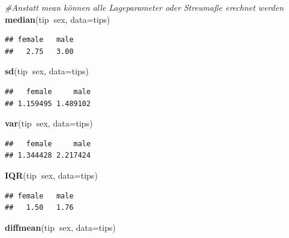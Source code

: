 \documentclass[10pt,ngerman,onside]{article}
\newenvironment{Shaded}{\begin{snugshade}}{\end{snugshade}}
\newcommand{\KeywordTok}[1]{\textcolor[rgb]{0.13,0.29,0.53}{\textbf{#1}}}
\newcommand{\DataTypeTok}[1]{\textcolor[rgb]{0.13,0.29,0.53}{#1}}
\newcommand{\CommentTok}[1]{\textcolor[rgb]{0.56,0.35,0.01}{\textit{#1}}}
\newcommand{\OperatorTok}[1]{\textcolor[rgb]{0.81,0.36,0.00}{\textbf{#1}}}
\newcommand{\NormalTok}[1]{#1}
\begin{document}
\begin{Shaded}
\begin{Highlighting}[]
\CommentTok{#Anstatt mean können alle Lageparameter oder Streumaße erechnet werden }
\KeywordTok{median}\NormalTok{(tip}\OperatorTok{~}\NormalTok{sex, }\DataTypeTok{data=}\NormalTok{tips)}
\end{Highlighting}
\end{Shaded}

\begin{verbatim}
## female   male 
##   2.75   3.00
\end{verbatim}

\begin{Shaded}
\begin{Highlighting}[]
\KeywordTok{sd}\NormalTok{(tip}\OperatorTok{~}\NormalTok{sex, }\DataTypeTok{data=}\NormalTok{tips)}
\end{Highlighting}
\end{Shaded}

\begin{verbatim}
##   female     male 
## 1.159495 1.489102
\end{verbatim}

\begin{Shaded}
\begin{Highlighting}[]
\KeywordTok{var}\NormalTok{(tip}\OperatorTok{~}\NormalTok{sex, }\DataTypeTok{data=}\NormalTok{tips)}
\end{Highlighting}
\end{Shaded}

\begin{verbatim}
##   female     male 
## 1.344428 2.217424
\end{verbatim}

\begin{Shaded}
\begin{Highlighting}[]
\KeywordTok{IQR}\NormalTok{(tip}\OperatorTok{~}\NormalTok{sex, }\DataTypeTok{data=}\NormalTok{tips)}
\end{Highlighting}
\end{Shaded}

\begin{verbatim}
## female   male 
##   1.50   1.76
\end{verbatim}

\begin{Shaded}
\begin{Highlighting}[]
\KeywordTok{diffmean}\NormalTok{(tip}\OperatorTok{~}\NormalTok{sex, }\DataTypeTok{data=}\NormalTok{tips)}
\end{Highlighting}
\end{Shaded}
\end{document}
